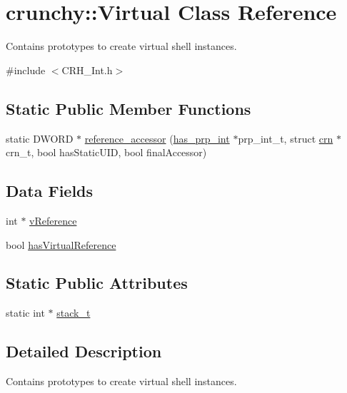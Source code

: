 \hypertarget{classcrunchy_1_1_virtual}{}\section{crunchy\+:\+:Virtual Class Reference}
\label{classcrunchy_1_1_virtual}


Contains prototypes to create virtual shell instances.  




{\ttfamily \#include $<$C\+R\+H\+\_\+\+Int.\+h$>$}

\subsection*{Static Public Member Functions}
\begin{DoxyCompactItemize}
\item 
static D\+W\+O\+R\+D $\ast$ \hyperlink{classcrunchy_1_1_virtual_a5021e8883bb9698a2f6018323b68355f}{reference\+\_\+accessor} (\hyperlink{structcrunchy_1_1has__prp__int}{has\+\_\+prp\+\_\+int} $\ast$prp\+\_\+int\+\_\+t, struct \hyperlink{structcrunchy_1_1crn}{crn} $\ast$crn\+\_\+t, bool has\+Static\+U\+I\+D, bool final\+Accessor)
\end{DoxyCompactItemize}
\subsection*{Data Fields}
\begin{DoxyCompactItemize}
\item 
int $\ast$ \hyperlink{classcrunchy_1_1_virtual_acf317286283a3916ccb1d4752074af5f}{v\+Reference}
\item 
bool \hyperlink{classcrunchy_1_1_virtual_a9dd9b11712ab44b00696838fc1da2c43}{has\+Virtual\+Reference}
\end{DoxyCompactItemize}
\subsection*{Static Public Attributes}
\begin{DoxyCompactItemize}
\item 
static int $\ast$ \hyperlink{classcrunchy_1_1_virtual_ad108e31577fcad0d6ff9ff6d7b3d5249}{stack\+\_\+t}
\end{DoxyCompactItemize}


\subsection{Detailed Description}
Contains prototypes to create virtual shell instances. 

